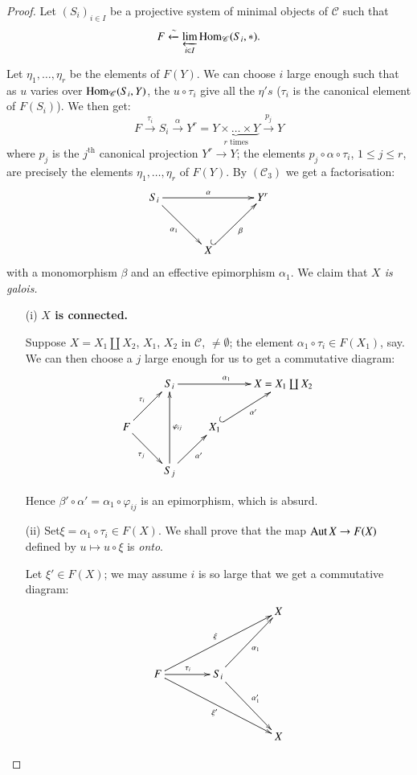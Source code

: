 \begin{proof}
Let $(S_{i})_{i\in I}$ be a projective system of minimal objects of
$\mathscr{C}$ such that
$$
F\xleftarrow{\sim} \varprojlim_{i\in I}\operatorname{Hom}_{\mathscr{C}}(S_{i},*).
$$

Let $\eta_{1},\ldots,\eta_{r}$ be the elements of $F(Y)$. We can
choose $i$ large enough such that as $u$ varies over
$\operatorname{Hom}_{\mathscr{C}}(S_{i},Y)$, the $u\circ \tau_{i}$ give all the
$\eta's$ ($\tau_{i}$ is the canonical element of $F(S_{i})$). We then
get:
$$
F\xrightarrow{\tau_{i}}S_{i}\xrightarrow{\alpha}Y^{r}=\underbrace{Y\times\ldots\times
  Y}_{r\text{\ times}}\xrightarrow{p_{j}}Y 
$$
where $p_{j}$ is the $j^{\text{th}}$ canonical projection $Y^{r}\to
Y$; the elements $p_{j}\circ\alpha\circ \tau_{i}$, $1\leq j\leq r$,
are precisely the elements $\eta_{1},\ldots,\eta_{r}$ of\pageoriginale
$F(Y)$. By $(\mathscr{C}_{3})$ we get a factorisation:
\[
\xymatrix@=1.2cm{
S_{i}\ar[rr]^{\alpha}\ar[dr]_{\alpha_{1}} & & Y^{r}\\
 & X\ar@{^{(}->}[ur]_{\beta} &
}
\]
with a monomorphism $\beta$ and an effective epimorphism
$\alpha_{1}$. We claim that {\em $X$ is galois.}
\begin{itemize}
\item[(i)] {\bf {\boldmath$X$} is connected.}

Suppose $X=X_{1}\coprod X_{2}$, $X_{1}$, $X_{2}$ in $\mathscr{C}$,
$\neq \emptyset$; the element $\alpha_{1}\circ \tau_{i}\in F(X_{1})$,
say. We can then choose a $j$ large enough for us to get a commutative
diagram: 
\[
\xymatrix{
 & S_{i}\ar[rr]^{\alpha_{1}} & & X=X_{1}\coprod X_{2}\\
F\ar[ur]^{\tau_{i}}\ar[dr]_{\tau_{j}} & &  X_{1}
\ar@{^{(}->}[ur]_{\alpha'} &\\
 & S_{j}\ar[ur]_{\alpha'}\ar[uu]_{\varphi_{ij}} & & 
}
\]

Hence $\beta'\circ\alpha'=\alpha_{1}\circ\varphi_{ij}$ is an
epimorphism, which is absurd. 

\item[(ii)] Set\pageoriginale $\xi=\alpha_{1}\circ\tau_{i}\in
  F(X)$. We shall prove that the map $\operatorname{Aut} X\to F(X)$ defined by
  $u\mapsto u\circ \xi$ is {\em onto}.

Let $\xi'\in F(X)$; we may assume $i$ is so large that we get a
commutative diagram:
\[
\xymatrix@C=1.4cm@R=1.5cm{
 & & X\\
F\ar[urr]^{\xi}\ar[r]^{\tau_{i}}\ar[drr]_{\xi'} & 
S_{i}\ar[dr]^{\alpha'_{1}}\ar[ur]_{\alpha_{1}} & \\ 
 & & X
}
\]


\end{itemize}
\end{proof}
